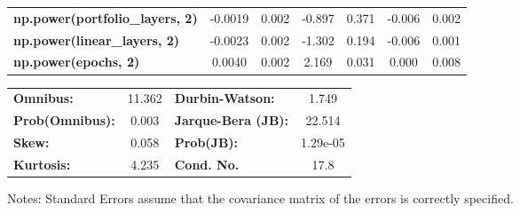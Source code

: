 \begin{center}
\begin{tabular}{lcccccc}
\textbf{np.power(portfolio\_layers, 2)}    &      -0.0019  &        0.002     &    -0.897  &         0.371        &       -0.006    &        0.002     \\
\textbf{np.power(linear\_layers, 2)}       &      -0.0023  &        0.002     &    -1.302  &         0.194        &       -0.006    &        0.001     \\
\textbf{np.power(epochs, 2)}               &       0.0040  &        0.002     &     2.169  &         0.031        &        0.000    &        0.008     \\
\bottomrule
\end{tabular}
\begin{tabular}{lclc}
\textbf{Omnibus:}       & 11.362 & \textbf{  Durbin-Watson:     } &    1.749  \\
\textbf{Prob(Omnibus):} &  0.003 & \textbf{  Jarque-Bera (JB):  } &   22.514  \\
\textbf{Skew:}          &  0.058 & \textbf{  Prob(JB):          } & 1.29e-05  \\
\textbf{Kurtosis:}      &  4.235 & \textbf{  Cond. No.          } &     17.8  \\
\bottomrule
\end{tabular}
\end{center}

Notes: \newline
 [1] Standard Errors assume that the covariance matrix of the errors is correctly specified.
